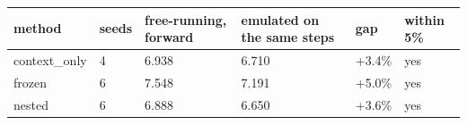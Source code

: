 \begin{tabular}{llllll}
\hline
method & seeds & free-running, forward & emulated on the same steps & gap & within 5\% \\
\hline
context\_only & 4 & 6.938 & 6.710 & +3.4\% & yes \\
frozen & 6 & 7.548 & 7.191 & +5.0\% & yes \\
nested & 6 & 6.888 & 6.650 & +3.6\% & yes \\
\hline
\end{tabular}

